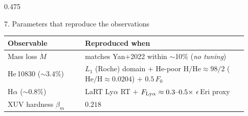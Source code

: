 \documentclass[final]{beamer}
\newlength{\colht}\setlength{\colht}{0.848\paperheight}
\newcommand{\Fo}{F_{0}}
\newcommand{\Mdot}{\dot{M}}
\begin{document}
\begin{frame}[t]{}
\begin{columns}[t]
\begin{column}{0.475\paperwidth}
\begin{minipage}[t][\colht][s]{\linewidth}
\begin{block}{7. Parameters that reproduce the observations}
\centering
\begin{tcolorbox}[colback=accent!10,colframe=accent,boxrule=1.2pt,sharp corners,
  left=4mm,right=4mm,top=3mm,bottom=3mm,width=\linewidth]
\renewcommand{\arraystretch}{1.15}
\begin{tabular}{@{}p{0.30\linewidth}p{0.63\linewidth}@{}}
\toprule
\textbf{Observable} & \textbf{Reproduced when} \\
\midrule
Mass loss $\Mdot$ & matches Yan+2022 within $\sim$10\% (\emph{no tuning}) \\
He\,10830 ($\sim\!3.4\%$) & $L_1$ (Roche) domain $+$ He-poor
  $\mathrm{H/He}\approx98/2$ ($\mathrm{He/H}\approx0.0204$) $+$ $0.5\,\Fo$ \\
H$\alpha$ ($\sim\!0.8\%$) & LaRT Ly$\alpha$ RT $+$
  $F_{\rm Ly\alpha}\approx0.3\text{--}0.5\times$ $\epsilon$\,Eri proxy \\
XUV hardness $\beta_m$ & $0.218$ \\
\bottomrule
\end{tabular}
\end{tcolorbox}
\end{block}

\vfill


\end{minipage}
\end{column}
\end{columns}
\end{frame}
\end{document}
